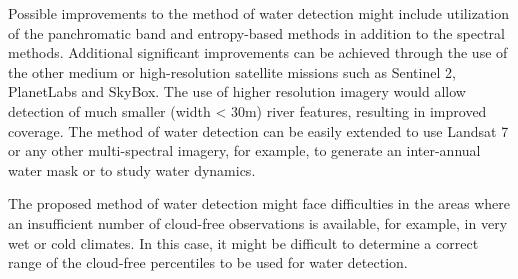 Possible improvements to the method of water detection might include utilization of the panchromatic band and entropy-based methods in addition to the spectral methods. Additional significant improvements can be achieved through the use of the other medium or high-resolution satellite missions such as Sentinel 2, PlanetLabs and SkyBox. The use of higher resolution imagery would allow detection of much smaller (width < 30m) river features, resulting in improved coverage.
The method of water detection can be easily extended to use Landsat 7 or any other multi-spectral imagery, for example, to generate an inter-annual water mask or to study water dynamics. 

The proposed method of water detection might face difficulties in the areas where an insufficient number of cloud-free observations is available, for example, in very wet or cold climates. In this case, it might be difficult to determine a correct range of the cloud-free percentiles to be used for water detection. 
